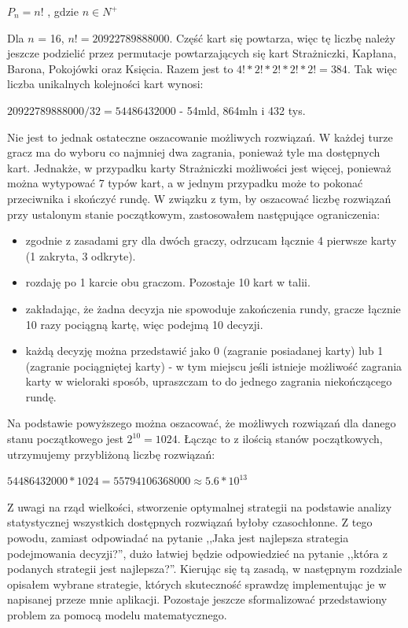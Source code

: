 \begin{center}
	$P_n = n!$ , gdzie $n\in N^+$
\end{center}

Dla  $n$ = 16, $n!=20 922 789 888 000$. Część kart się powtarza, więc tę liczbę należy jeszcze podzielić przez permutacje powtarzających się kart Strażniczki, Kapłana, Barona, Pokojówki oraz Księcia. Razem jest to $4! * 2! * 2! * 2! * 2! =  384$. Tak więc liczba unikalnych kolejności kart wynosi: 

\begin{center}
	$20 922 789 888 000 / 32 = 54486432000$ - 54mld, 864mln i 432 tys.
\end{center}

Nie jest to jednak ostateczne oszacowanie możliwych rozwiązań. W każdej turze gracz ma do wyboru co najmniej dwa zagrania, ponieważ tyle ma dostępnych kart. Jednakże, w przypadku karty Strażniczki możliwości jest więcej, ponieważ można wytypować 7 typów kart, a w jednym przypadku może to pokonać przeciwnika i skończyć rundę. W związku z tym, by oszacować liczbę rozwiązań przy ustalonym stanie początkowym, zastosowałem następujące ograniczenia:
\begin{itemize}
	\item zgodnie z zasadami gry dla dwóch graczy, odrzucam łącznie 4 pierwsze karty (1 zakryta, 3 odkryte).
	\item rozdaję po 1 karcie obu graczom. Pozostaje 10 kart w talii.
	\item zakładając, że żadna decyzja nie spowoduje zakończenia rundy, gracze łącznie 10 razy pociągną kartę, więc podejmą 10 decyzji.
	\item każdą decyzję można przedstawić jako 0 (zagranie posiadanej karty) lub 1 (zagranie pociągniętej karty) - w tym miejscu jeśli istnieje możliwość zagrania karty w wieloraki sposób, upraszczam to do jednego zagrania niekończącego rundę.
\end{itemize}
Na podstawie powyższego można oszacować, że możliwych rozwiązań dla danego stanu początkowego jest $2^{10}=1024$. Łącząc to z ilością stanów początkowych, utrzymujemy przybliżoną liczbę rozwiązań:

\begin{center}
	$54486432000 * 1024 = 55794106368000 \approx  5.6*10^{13}$
\end{center}

Z uwagi na rząd wielkości, stworzenie optymalnej strategii na podstawie analizy statystycznej wszystkich dostępnych rozwiązań byłoby czasochłonne. Z tego powodu, zamiast odpowiadać na pytanie ,,Jaka jest najlepsza strategia podejmowania decyzji?'', dużo łatwiej będzie odpowiedzieć na pytanie ,,która z podanych strategii jest najlepsza?''. Kierując się tą zasadą, w następnym rozdziale opisałem wybrane strategie, których skuteczność sprawdzę implementując je w napisanej przeze mnie aplikacji. Pozostaje jeszcze sformalizować przedstawiony problem za pomocą modelu matematycznego.


